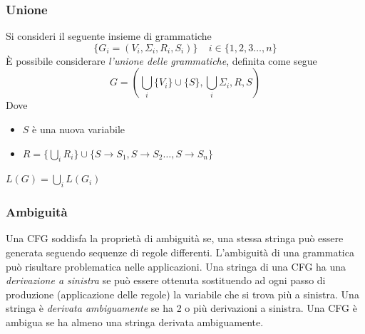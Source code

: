 \documentclass[10pt, letterpaper]{report}
\begin{document}
\subsubsection{Unione}
Si consideri il seguente insieme di grammatiche 
$$ \{G_i=(V_i,\Sigma_i,R_i,S_i)\}\ \ \ \ \ i\in\{1,2,3\dots,n\}$$
È possibile considerare \textit{l'unione delle grammatiche}, definita come segue
$$G=(\bigcup_i\{V_i\}\cup \{S\},\bigcup_i\Sigma_i,R,S) $$
Dove\begin{itemize}
    \item $S$ è una nuova variabile 
    \item $R=\{\bigcup_iR_i\}\cup\{S\rightarrow S_1, S\rightarrow S_2 \dots, S\rightarrow S_n\}$
\end{itemize}
\prop{} $L(G)=\bigcup_i L(G_i)$
\subsubsection{Ambiguità}
Una CFG soddisfa la proprietà di ambiguità se, una stessa stringa può essere generata seguendo 
sequenze di regole differenti. L'ambiguità di una grammatica può risultare problematica nelle applicazioni.\acc 
{} Una stringa di una CFG ha una \textit{derivazione a sinistra} se può essere ottenuta 
sostituendo ad ogni passo di produzione (applicazione delle regole) la variabile che si trova più a sinistra. Una 
stringa è \textit{derivata ambiguamente} se ha 2 o più derivazioni a sinistra. Una CFG è ambigua se ha almeno una 
stringa derivata ambiguamente. 
\end{document}
